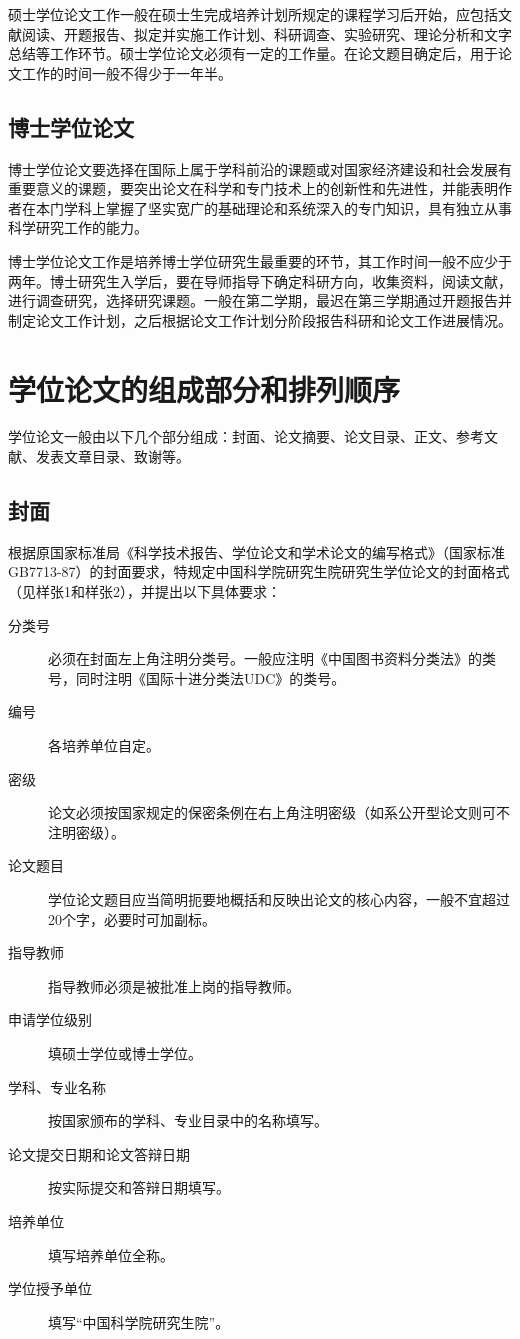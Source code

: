 \documentclass[a4paper,12pt,oneside,openany]{book}
\begin{document}
硕士学位论文工作一般在硕士生完成培养计划所规定的课程学习后开始，应包括文献阅读、开题报告、拟定并实施工作计划、科研调查、实验研究、理论分析和文字总结等工作环节。硕士学位论文必须有一定的工作量。在论文题目确定后，用于论文工作的时间一般不得少于一年半。


\subsection{博士学位论文}

博士学位论文要选择在国际上属于学科前沿的课题或对国家经济建设和社会发展有重要意义的课题，要突出论文在科学和专门技术上的创新性和先进性，并能表明作者在本门学科上掌握了坚实宽广的基础理论和系统深入的专门知识，具有独立从事科学研究工作的能力。

博士学位论文工作是培养博士学位研究生最重要的环节，其工作时间一般不应少于两年。博士研究生入学后，要在导师指导下确定科研方向，收集资料，阅读文献，进行调查研究，选择研究课题。一般在第二学期，最迟在第三学期通过开题报告并制定论文工作计划，之后根据论文工作计划分阶段报告科研和论文工作进展情况。


\section{学位论文的组成部分和排列顺序}

学位论文一般由以下几个部分组成：封面、论文摘要、论文目录、正文、参考文献、发表文章目录、致谢等。


\subsection{封面}

根据原国家标准局《科学技术报告、学位论文和学术论文的编写格式》（国家标准GB7713-87）的封面要求，特规定中国科学院研究生院研究生学位论文的封面格式（见样张1和样张2），并提出以下具体要求：
\begin{description}
\item [{分类号}] 必须在封面左上角注明分类号。一般应注明《中国图书资料分类法》的类号，同时注明《国际十进分类法UDC》的类号。
\item [{编号}] 各培养单位自定。
\item [{密级}] 论文必须按国家规定的保密条例在右上角注明密级（如系公开型论文则可不注明密级）。
\item [{论文题目}] 学位论文题目应当简明扼要地概括和反映出论文的核心内容，一般不宜超过20个字，必要时可加副标。
\item [{指导教师}] 指导教师必须是被批准上岗的指导教师。
\item [{申请学位级别}] 填硕士学位或博士学位。
\item [{学科、专业名称}] 按国家颁布的学科、专业目录中的名称填写。
\item [{论文提交日期和论文答辩日期}] 按实际提交和答辩日期填写。
\item [{培养单位}] 填写培养单位全称。
\item [{学位授予单位}] 填写“中国科学院研究生院”。
\end{description}
\end{document}
